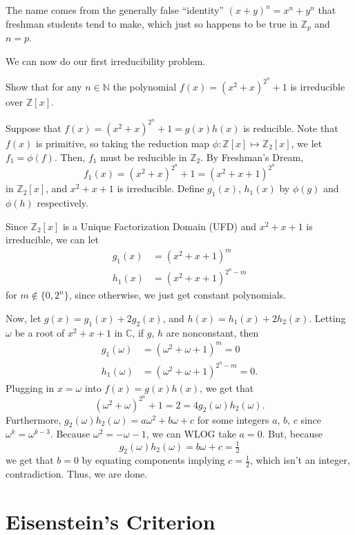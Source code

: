 \documentclass[11pt]{scrartcl}
\begin{document}
\begin{remark*}
The name comes from the generally false ``identity'' $(x+y)^n = x^n+y^n$ that freshman students tend to make, which just so happens to be true in $\mathbb{Z}_p$ and $n = p$.
\end{remark*}

We can now do our first irreducibility problem.

\begin{example*}
Show that for any $n \in \mathbb{N}$ the polynomial $f(x) = (x^2 +x)^{2^n}+1$ is irreducible over $\mathbb{Z}[x]$.
\end{example*}

Suppose that $f(x)=(x^2+x)^{2^n}+1=g(x)h(x)$ is reducible. Note that $f(x)$ is primitive, so taking the reduction map $\phi: \mathbb{Z}[x] \mapsto \mathbb{Z}_2[x]$, we let $f_1 = \phi(f)$. Then, $f_1$ must be reducible in $\mathbb{Z}_2$. By Freshman's Dream, \[f_1(x) = (x^2 +x)^{2^n}+1 = (x^2+x+1)^{2^n}\] in $\mathbb{Z}_2[x]$, and $x^2+x+1$ is irreducible. Define $g_1(x)$, $h_1(x)$ by $\phi(g)$ and $\phi(h)$ respectively.

Since $\mathbb{Z}_2[x]$ is a Unique Factorization Domain (UFD) and $x^2+x+1$ is irreducible, we can let
\begin{align*}
g_1(x)&=(x^2+x+1)^m \\
h_1(x)&=(x^2+x+1)^{2^n-m}
\end{align*}
for $m\not\in \{0, 2^n\}$, since otherwise, we just get constant polynomials.

Now, let $g(x)=g_1(x)+2g_2(x)$, and $h(x)=h_1(x)+2h_2(x)$. Letting $\omega$ be a root of $x^2+x+1$ in $\mathbb{C}$, if $g$, $h$ are nonconstant, then \begin{align*}
g_1(\omega)&=(\omega^2+\omega+1)^m = 0 \\
h_1(\omega)&=(\omega^2+\omega+1)^{2^n-m} = 0.
\end{align*}
Plugging in $x = \omega$ into $f(x) = g(x)h(x)$, we get that \[(\omega^2+\omega)^{2^n}+1 = 2 = 4g_2(\omega)h_2(\omega).\] Furthermore, $g_2(\omega)h_2(\omega)=a\omega^2+b\omega+c$ for some integers $a$, $b$, $c$ since $\omega^k = \omega^{k-3}$. Because $\omega^2 = -\omega-1$, we can WLOG take $a=0$. But, because \[g_2(\omega)h_2(\omega) = b\omega+c = \tfrac{1}{2}\] we get that $b = 0$ by equating components implying $c = \tfrac{1}{2}$, which isn't an integer, contradiction. Thus, we are done.

\section{Eisenstein's Criterion}
\end{document}
